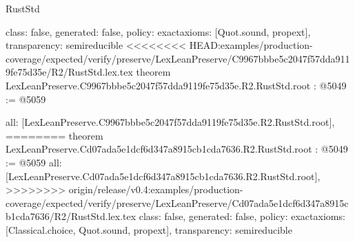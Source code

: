 \begin{lexlean}{RustStd}
\begin{coremodule}
{\begin{coremodule}
{{{{{{{{{{  class: false,
  generated: false,
  policy: exact{axioms: [Quot.sound, propext]},
  transparency: semireducible
}
<<<<<<<< HEAD:examples/production-coverage/expected/verify/preserve/LexLeanPreserve/C9967bbbe5c2047f57dda9119fe75d35e/R2/RustStd.lex.tex
theorem LexLeanPreserve.C9967bbbe5c2047f57dda9119fe75d35e.R2.RustStd.root : @5049 := @5059 {
  all: [LexLeanPreserve.C9967bbbe5c2047f57dda9119fe75d35e.R2.RustStd.root],
========
theorem LexLeanPreserve.Cd07ada5e1dcf6d347a8915cb1cda7636.R2.RustStd.root : @5049 := @5059 {
  all: [LexLeanPreserve.Cd07ada5e1dcf6d347a8915cb1cda7636.R2.RustStd.root],
>>>>>>>> origin/release/v0.4:examples/production-coverage/expected/verify/preserve/LexLeanPreserve/Cd07ada5e1dcf6d347a8915cb1cda7636/R2/RustStd.lex.tex
  class: false,
  generated: false,
  policy: exact{axioms: [Classical.choice, Quot.sound, propext]},
  transparency: semireducible
}

}}}}}}}}}}
\end{coremodule}}
\end{coremodule}
\end{lexlean}
